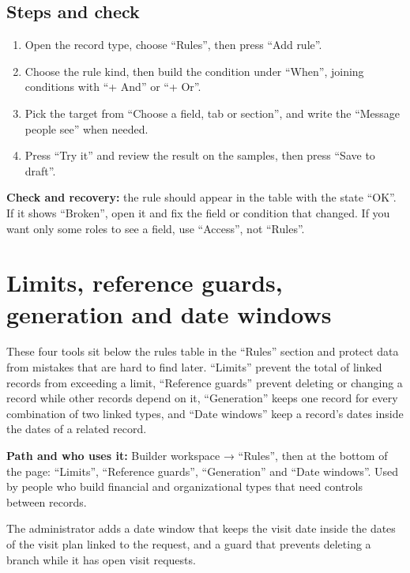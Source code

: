 \subsection{Steps and check}
\begin{enumerate}
\item Open the record type, choose “Rules”, then press “Add rule”.
\item Choose the rule kind, then build the condition under “When”, joining conditions with “+ And” or “+ Or”.
\item Pick the target from “Choose a field, tab or section”, and write the “Message people see” when needed.
\item Press “Try it” and review the result on the samples, then press “Save to draft”.
\end{enumerate}

\textbf{Check and recovery:} the rule should appear in the table with the state “OK”. If it shows “Broken”, open it and fix the field or condition that changed. If you want only some roles to see a field, use “Access”, not “Rules”.

\clearpage
\section{Limits, reference guards, generation and date windows}
\label{sec:builder-feature-record-limits}

These four tools sit below the rules table in the “Rules” section and protect data from mistakes that are hard to find later. “Limits” prevent the total of linked records from exceeding a limit, “Reference guards” prevent deleting or changing a record while other records depend on it, “Generation” keeps one record for every combination of two linked types, and “Date windows” keep a record's dates inside the dates of a related record.

\textbf{Path and who uses it:} Builder workspace → “Rules”, then at the bottom of the page: “Limits”, “Reference guards”, “Generation” and “Date windows”. Used by people who build financial and organizational types that need controls between records.

\begin{rcnote}
The administrator adds a date window that keeps the visit date inside the dates of the visit plan linked to the request, and a guard that prevents deleting a branch while it has open visit requests.
\end{rcnote}

